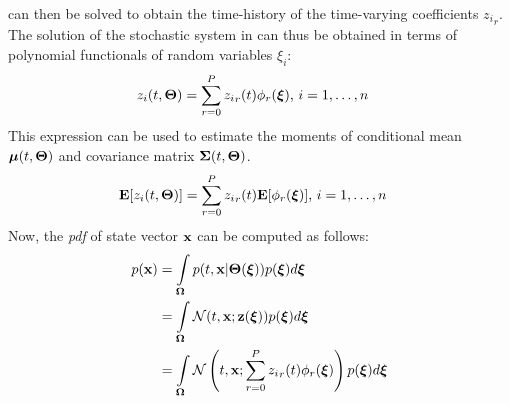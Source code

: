 \documentclass[10pt, conference]{IEEEtran}
\begin{document}
 can then be solved to obtain the time-history of the time-varying coefficients ${z_i}_r$. The solution of the stochastic system in  can thus be obtained in terms of polynomial functionals of random variables $\xi_i$:
\begin{align}
z_i(t,\boldsymbol{\Theta}) &= \sum_{r=0}^P {z_i}_r(t)\phi_r(\boldsymbol{\xi}) \mbox{, $i=1,\ldots,n$} \notag
\end{align}
This expression can be used to estimate the moments of conditional mean $\boldsymbol{\mu}(t,\boldsymbol{\Theta})$ and covariance matrix $\boldsymbol{\Sigma}(t,\boldsymbol{\Theta})$.
\begin{align}
\mathbf{E}[z_i(t,\boldsymbol{\Theta})] &= \sum_{r=0}^P {z_i}_r(t)\mathbf{E}[\phi_r(\boldsymbol{\xi})] \mbox{, $i=1,\ldots,n$} \notag
\end{align}
Now, the \textit{pdf} of state vector $\mathbf{x}$ can be computed as follows:
\begin{align}
p(\mathbf{x})&=\int\limits_{\boldsymbol{\Omega}}{p(t,\mathbf{x}|\boldsymbol{\Theta}(\boldsymbol{\xi}))p(\boldsymbol{\xi})d\boldsymbol{\xi}} \notag\\
&=\int\limits_{\boldsymbol{\Omega}}\mathcal{N}(t,\mathbf{x};\mathbf{z}(\boldsymbol{\xi}))p(\boldsymbol{\xi})d\boldsymbol{\xi} \notag\\
&=\int\limits_{\boldsymbol{\Omega}}\mathcal{N}\left(t,\mathbf{x};\sum_{r=0}^P {z_i}_r(t)\phi_r(\boldsymbol{\xi})\right)p(\boldsymbol{\xi})d\boldsymbol{\xi}
\end{align}
\end{document}
